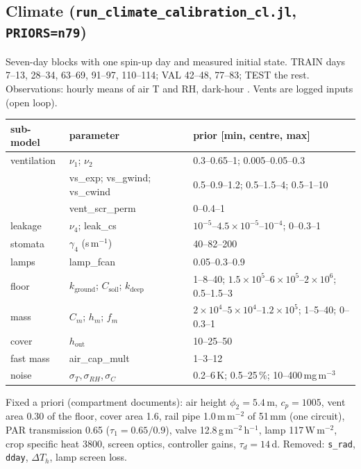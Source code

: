 \documentclass[11pt,a4paper]{article}
\begin{document}
\subsection{Climate (\texttt{run\_climate\_calibration\_cl.jl}, \texttt{PRIORS=n79})}\label{sec:infclim}
Seven-day blocks with one spin-up day and measured initial state. TRAIN days 7--13, 28--34, 63--69, 91--97,
110--114; VAL 42--48, 77--83; TEST the rest. Observations: hourly means of air T and RH, dark-hour .
Vents are logged inputs (open loop).
\begin{center}\small
\begin{tabular}{lll}
\toprule
sub-model & parameter & prior [min, centre, max]\\
\midrule
ventilation & $\nu_1$; $\nu_2$ & 0.3--0.65--1; 0.005--0.05--0.3\\
 & vs\_exp; vs\_gwind; vs\_cwind & 0.5--0.9--1.2; 0.5--1.5--4; 0.5--1--10\\
 & vent\_scr\_perm & 0--0.4--1\\
leakage & $\nu_4$; leak\_cs & $10^{-5}$--$4.5\!\times\!10^{-5}$--$10^{-4}$; 0--0.3--1\\
stomata & $\gamma_4$ (s\,m$^{-1}$) & 40--82--200\\
lamps & lamp\_fcan & 0.05--0.3--0.9\\
floor & $k_{\text{ground}}$; $C_{\text{soil}}$; $k_{\text{deep}}$ & 1--8--40; $1.5\!\times\!10^5$--$6\!\times\!10^5$--$2\!\times\!10^6$; 0.5--1.5--3\\
mass & $C_m$; $h_m$; $f_m$ & $2\!\times\!10^4$--$5\!\times\!10^4$--$1.2\!\times\!10^5$; 1--5--40; 0--0.3--1\\
cover & $h_{\text{out}}$ & 10--25--50\\
fast mass & air\_cap\_mult & 1--3--12\\
noise & $\sigma_T,\sigma_{RH},\sigma_C$ & 0.2--6\,K; 0.5--25\,\%; 10--400\,mg\,m$^{-3}$\\
\bottomrule
\end{tabular}
\end{center}
Fixed a priori (compartment documents): air height $\phi_2=5.4$\,m, $c_p=1005$, vent area $0.30$ of the floor,
cover area 1.6, rail pipe 1.0\,m\,m$^{-2}$ of 51\,mm (one circuit), PAR transmission 0.65
($\tau_1=0.65/0.9$),  valve 12.8\,g\,m$^{-2}$\,h$^{-1}$, lamp 117\,W\,m$^{-2}$, crop specific heat 3800,
screen optics, controller gains, $\tau_d=14$\,d. Removed: \texttt{s\_rad}, \texttt{dday}, $\Delta T_h$, lamp screen loss.
\end{document}

